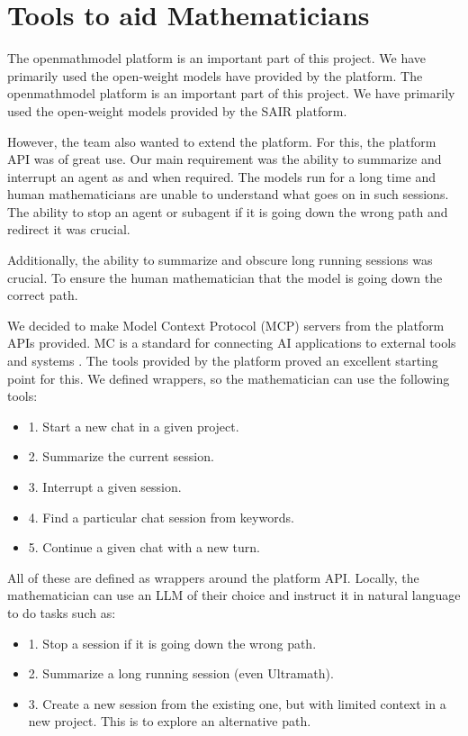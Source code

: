 \documentclass[12 pt]{article}
\theoremstyle{definition}
\begin{document}
\section{Tools to aid Mathematicians}
The openmathmodel platform is an important part of this project. We have primarily used the open-weight models have provided by the platform.
The openmathmodel platform is an important part of this project. We have primarily used the open-weight models provided by the SAIR \cite{SAIR} platform.


However, the team also wanted to extend the platform. For this, the platform API was of great use. Our main requirement was the ability to summarize and interrupt an agent as and when required. The models run for a long time and human mathematicians are unable to understand what goes on in such sessions. The ability to stop an agent or subagent if it is going down the wrong path and redirect it was crucial. 


Additionally, the ability to summarize and obscure long running sessions was crucial. To ensure the human mathematician that the model is going down the correct path. 


We decided to make Model Context Protocol (MCP) servers from the platform APIs provided. MC is a standard for connecting AI applications to external tools and systems \cite{MCP}. The tools provided by the platform proved an excellent starting point for this. We defined wrappers, so the mathematician can use the following tools: 

\begin{itemize}
\item 1. Start a new chat in a given project.
\item 2. Summarize the current session.
\item 3. Interrupt a given session.
\item 4. Find a particular chat session from keywords.
\item 5. Continue a given chat with a new turn.
\end{itemize}


All of these are defined as wrappers around the platform API. Locally, the mathematician can use an LLM of their choice and instruct it in natural language to do tasks such as:

\begin{itemize}
\item 1. Stop a session if it is going down the wrong path.
\item 2. Summarize a long running session (even Ultramath).
\item 3. Create a new session from the existing one, but with limited context in a new project. This is to explore an alternative path.
\end{itemize}
\end{document}

